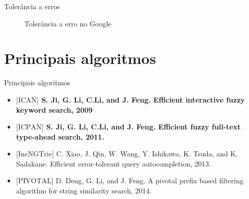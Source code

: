 \documentclass[11pt]{beamer}
\begin{document}
\begin{frame}{Tolerância a erros}
    \begin{figure}
        \centering
        \caption{Tolerância a erro no Google}
        \label{fig:fig}
    \end{figure}

\end{frame}

\section{Principais algoritmos}

\begin{frame}{Principais algoritmos}
    
   \begin{itemize}
		\item \textbf{$\big[ \text{ICAN} \big]$ S. Ji, G. Li, C.Li, and J. Feng. Efficient interactive fuzzy keyword search, 2009}
		\item \textbf{$\big[ \text{ICPAN} \big]$ S. Ji, G. Li, C.Li, and J. Feng. Efficient fuzzy full-text type-ahead search, 2011.}
		\item $\big[ \text{IncNGTrie} \big]$ C. Xiao, J. Qin, W. Wang, Y. Ishikawa, K. Tsuda, and K. Sadakane. Efficient error-tolerant query autocompletion, 2013.
		\item $\big[ \text{PIVOTAL} \big]$ D. Deng, G. Li, and J. Feng. A pivotal prefix based filtering algorithm for string similarity search, 2014.
    \end{itemize} 
    
\end{frame}
\end{document}
